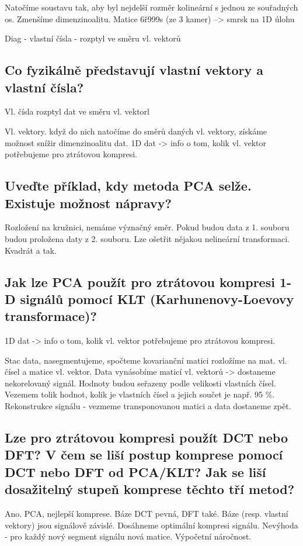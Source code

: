 \documentclass[a4paper,12pt]{article}   %
\begin{document}
Natočíme soustavu tak, aby byl nejdelší rozměr kolineární s jednou ze souřadných os. Zmenšíme dimenzinoalitu. Matice 6ř999s (ze 3 kamer) --> smrsk na 1D úlohu

Diag - vlastní čísla - rozptyl ve směru vl. vektorů


\subsection{Co fyzikálně představují vlastní vektory a vlastní čísla?}
Vl. čísla rozptyl dat ve směru vl. vektorl

Vl. vektory. když do nich natočíme do směrů daných vl. vektory, získáme možnost snížir dimenzinoalitu dat. 1D dat -> info o tom, kolik vl. vektor potřebujeme pro ztrátovou kompresi. 



\subsection{Uveďte příklad, kdy metoda PCA selže. Existuje možnost nápravy?}

Rozložení na kružnici, nemáme význačný směr. Pokud budou data z 1. souboru budou proložena daty z 2. souboru. Lze ošetřit nějakou nelineární transformaci. Kvadrát a tak.

\subsection{Jak lze PCA použít pro ztrátovou kompresi 1-D signálů pomocí KLT (Karhunenovy-Loevovy transformace)?}

1D dat -> info o tom, kolik vl. vektor potřebujeme pro ztrátovou kompresi. 

Stac data, nasegmentujeme, spočteme kovarianční matici  rozložíme na mat. vl. čísel a matice vl. vektor. Data vynásobíme maticí vl. vektorů -> dostaneme nekorelovaný signál. Hodnoty budou seřazeny podle velikosti vlastních čísel. Vezemem tolik hodnot, kolik je vlastních čísel a jejich součet je např. 95 \%. Rekonstrukce signálu - vezmeme transponovanou matici a data dostaneme zpět.


\subsection{Lze pro ztrátovou kompresi použít DCT nebo DFT? V čem se liší postup komprese pomocí DCT nebo DFT od PCA/KLT? Jak se liší dosažitelný stupeň komprese těchto tří metod?}
Ano. PCA, nejlepší komprese. Báze DCT pevná, DFT také. Báze (resp. vlastní vektory) jsou signálově závislé. Dosáhneme optimální kompresi signálu. Nevýhoda - pro každý nový segment signálu nová matice. Výpočetní náročnost. 
\end{document}
